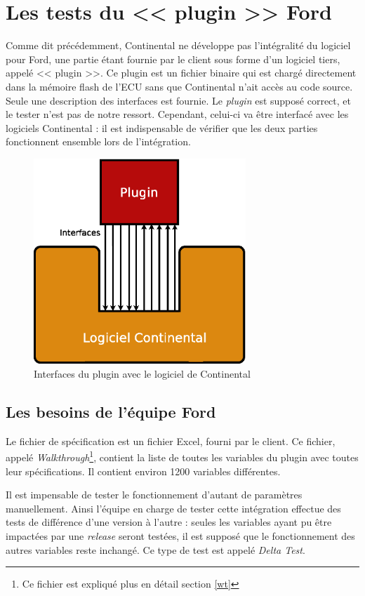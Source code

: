 	\section{Les tests du << plugin >> Ford}\label{plugin}
	Comme dit précédemment, Continental ne développe pas l'intégralité du logiciel pour Ford, une partie étant fournie par le client sous forme d'un logiciel tiers, appelé << plugin >>. Ce plugin est un fichier binaire qui est chargé directement dans la mémoire flash de l'ECU sans que Continental n'ait accès au code source. Seule une description des interfaces est fournie. Le \textit{plugin} est supposé correct, et le tester n'est pas de notre ressort. Cependant, celui-ci va être interfacé avec les logiciels Continental : il est indispensable de vérifier que les deux parties fonctionnent ensemble lors de l'intégration.
	\begin{figure}[H]
		\centering
		\includegraphics[width=8.0cm]{contents/images/plugin.eps}
		\caption{Interfaces du plugin avec le logiciel de Continental}
		\label{fig:plugin}	
	\end{figure}
	
	\subsection{Les besoins de l'équipe Ford}
	Le fichier de spécification est un fichier Excel, fourni par le client. Ce fichier, appelé \textit{Walkthrough}\footnote{Ce fichier est expliqué plus en détail section \ref{wt}}, 
	contient la liste de toutes les variables du plugin avec toutes leur spécifications. Il contient
	environ 1200 variables différentes. 
	
	Il est impensable de tester le fonctionnement d'autant de paramètres manuellement. Ainsi l'équipe en
	charge de tester cette intégration effectue des tests de différence d'une version à l'autre : seules les variables ayant pu être impactées par une \textit{release} seront testées, il est supposé que le fonctionnement des autres variables reste inchangé. Ce type de test est appelé \textit{Delta Test}.
	
